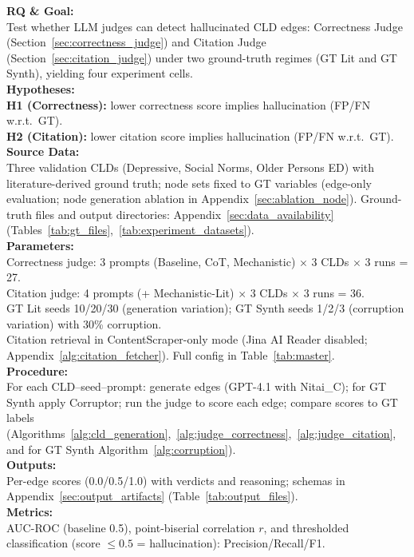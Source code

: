 \noindent\textbf{RQ \& Goal:}\\
Test whether LLM judges can detect hallucinated CLD edges: Correctness Judge (Section~\ref{sec:correctness_judge}) and Citation Judge (Section~\ref{sec:citation_judge}) under two ground-truth regimes (GT Lit and GT Synth), yielding four experiment cells.\\
\textbf{Hypotheses:}\\
\textbf{H1 (Correctness):} lower correctness score implies hallucination (FP/FN w.r.t.\ GT).\\
\textbf{H2 (Citation):} lower citation score implies hallucination (FP/FN w.r.t.\ GT).\\
\textbf{Source Data:}\\
Three validation CLDs (Depressive, Social Norms, Older Persons ED) with literature-derived ground truth; node sets fixed to GT variables (edge-only evaluation; node generation ablation in Appendix~\ref{sec:ablation_node}). Ground-truth files and output directories: Appendix~\ref{sec:data_availability} (Tables~\ref{tab:gt_files},~\ref{tab:experiment_datasets}).\\
\textbf{Parameters:}\\
Correctness judge: 3 prompts (Baseline, CoT, Mechanistic) $\times$ 3 CLDs $\times$ 3 runs = 27.\\
Citation judge: 4 prompts (+ Mechanistic-Lit) $\times$ 3 CLDs $\times$ 3 runs = 36.\\
GT Lit seeds 10/20/30 (generation variation); GT Synth seeds 1/2/3 (corruption variation) with 30\% corruption.\\
Citation retrieval in ContentScraper-only mode (Jina AI Reader disabled; Appendix~\ref{alg:citation_fetcher}). Full config in Table~\ref{tab:master}.\\
\textbf{Procedure:}\\
For each CLD--seed--prompt: generate edges (GPT-4.1 with Nitai\_C); for GT Synth apply Corruptor; run the judge to score each edge; compare scores to GT labels (Algorithms~\ref{alg:cld_generation},~\ref{alg:judge_correctness},~\ref{alg:judge_citation}, and for GT Synth Algorithm~\ref{alg:corruption}).\\
\textbf{Outputs:}\\
Per-edge scores (0.0/0.5/1.0) with verdicts and reasoning; schemas in Appendix~\ref{sec:output_artifacts} (Table~\ref{tab:output_files}).\\
\textbf{Metrics:}\\
AUC-ROC (baseline 0.5), point-biserial correlation $r$, and thresholded classification (score $\leq 0.5$ = hallucination): Precision/Recall/F1.\\
